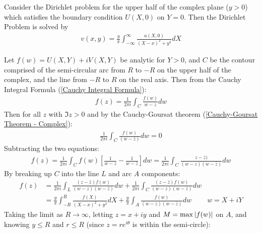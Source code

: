 \documentclass[12pt, english]{book}
\makeatletter
\renewenvironment{proof}[1][\proofname]{\par
	\pushQED{\qed}%
	\normalfont \topsep6\p@\@plus6\p@\relax
	\list{}{%
		\settowidth{\leftmargin}{\itshape\proofname:\hskip\labelsep}%
		\setlength{\labelwidth}{0pt}%
		\setlength{\itemindent}{-\leftmargin}%
	}%
	\item[\hskip\labelsep\itshape#1\@addpunct{:}]\ignorespaces
	}{ \popQED\endlist\@endpefalse}
\makeatother
\begin{document}
	\begin{definition}
		\label{Poisson Integral Formula (Upper Half Plane) Definition - Complex}
		Consider the Dirichlet problem for the upper half of the complex plane (\(y>0\)) which satisfies the boundary condition \(U(X,0)\) on \(Y = 0\). Then the Dirichlet Problem is solved by 
		\begin{align*}
			v(x,y) = \frac{y}{\pi} \int_{-\infty}^{\infty} \frac{u(X,0)}{(X-x)^2 + y^2} dX
		\end{align*}
	\end{definition}
	\begin{proof}
		Let \(f(w) = U(X,Y) + iV(X,Y)\) be analytic for \(Y>0\), and \(C\) be the contour comprised of the semi-circular arc from \(R\) to \(-R\) on the upper half of the complex, and the line from \(-R\) to \(R\) on the real axis. Then from the Cauchy Integral Formula (\cref{Cauchy Integral Formula}):
		\begin{align*}
			f(z) = \frac{1}{2\pi i} \int_{C} \frac{f(w)}{w-z} dw
		\end{align*}
		Then for all \(z\) with \(\Im{z}>0\) and by the Cauchy-Goursat theorem (\cref{Cauchy-Goursat Theorem - Complex}):
		\begin{align*}
			\frac{1}{2\pi i} \int_{C} \frac{f(w)}{(w-\bar{z})} dw = 0
		\end{align*}
		Subtracting the two equations:
		\begin{align*}
			f(z) 
			= \frac{1}{2\pi i} \int_{C} f(w) \left[\frac{1}{w - z} - \frac{1}{w - \bar{z}}\right] dw
			= \frac{1}{2\pi i} \int_{C} \frac{z - \bar{z})}{(w - z)(w - \bar{z})} dw
		\end{align*}
		By breaking up \(C\) into the line \(L\) and arc \(A\) components:
		\begin{align*}
			f(z) 
			&= \frac{1}{2\pi i} \int_{L} \frac{(z-\bar{z})f(w)}{(w-z)(w-\bar{z})} dw
			  + \frac{1}{2\pi i} \int_{C} \frac{(z-\bar{z})f(w)}{(w-z)(w-\bar{z})} dw \\
			&= \frac{y}{\pi} \int_{-R}^{R} \frac{f(X)}{(X-x)^2 + y^2} dX
			  + \frac{y}{\pi} \int_{A} \frac{f(w)}{(w-z)(w-\bar{z})} dw 
			  & w = X + iY
		\end{align*}
		Taking the limit as \(R \rightarrow \infty\), letting \(z = x+iy\) and \(M = \max\abs{f(w)}\) on \(A\), and knowing \(y \leq R\) and \(r \leq R\) (since \(z = re^{i\theta}\) is within the semi-circle):
		{\color{Grey}
		\begin{align*}

\end{align*}}
\end{proof}
\end{document}

